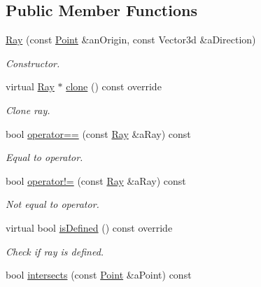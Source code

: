 \subsection*{Public Member Functions}
\begin{DoxyCompactItemize}
\item 
\hyperlink{classlibrary_1_1math_1_1geom_1_1d3_1_1objects_1_1_ray_a11b7613464daaebc6e25a758b057f203}{Ray} (const \hyperlink{classlibrary_1_1math_1_1geom_1_1d3_1_1objects_1_1_point}{Point} \&an\+Origin, const Vector3d \&a\+Direction)
\begin{DoxyCompactList}\small\item\em Constructor. \end{DoxyCompactList}\item 
virtual \hyperlink{classlibrary_1_1math_1_1geom_1_1d3_1_1objects_1_1_ray}{Ray} $\ast$ \hyperlink{classlibrary_1_1math_1_1geom_1_1d3_1_1objects_1_1_ray_a247ea36c39c3b44d003b157689850ae4}{clone} () const override
\begin{DoxyCompactList}\small\item\em Clone ray. \end{DoxyCompactList}\item 
bool \hyperlink{classlibrary_1_1math_1_1geom_1_1d3_1_1objects_1_1_ray_a90dbc4baa23e5f74b26b566bb862592f}{operator==} (const \hyperlink{classlibrary_1_1math_1_1geom_1_1d3_1_1objects_1_1_ray}{Ray} \&a\+Ray) const
\begin{DoxyCompactList}\small\item\em Equal to operator. \end{DoxyCompactList}\item 
bool \hyperlink{classlibrary_1_1math_1_1geom_1_1d3_1_1objects_1_1_ray_a0cd84346b37f62793b565c87ae4659fb}{operator!=} (const \hyperlink{classlibrary_1_1math_1_1geom_1_1d3_1_1objects_1_1_ray}{Ray} \&a\+Ray) const
\begin{DoxyCompactList}\small\item\em Not equal to operator. \end{DoxyCompactList}\item 
virtual bool \hyperlink{classlibrary_1_1math_1_1geom_1_1d3_1_1objects_1_1_ray_a7329f77a549a02e9c27d07c11adcc8bf}{is\+Defined} () const override
\begin{DoxyCompactList}\small\item\em Check if ray is defined. \end{DoxyCompactList}\item 
bool \hyperlink{classlibrary_1_1math_1_1geom_1_1d3_1_1objects_1_1_ray_a83300d3992b2f963c5b60a8be6748da0}{intersects} (const \hyperlink{classlibrary_1_1math_1_1geom_1_1d3_1_1objects_1_1_point}{Point} \&a\+Point) const

\end{DoxyCompactItemize}
